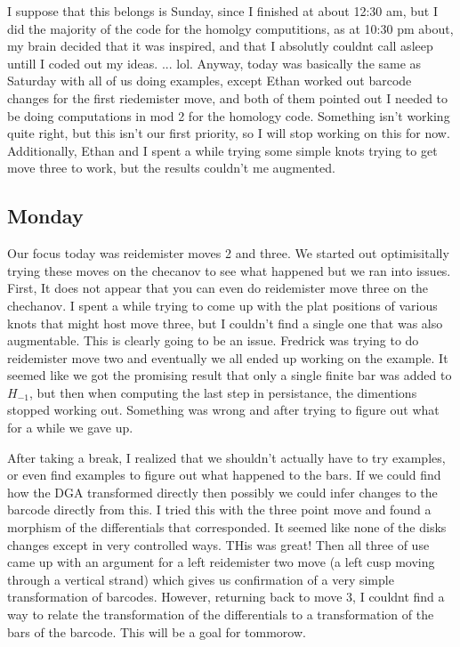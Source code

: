 \documentclass[11pt,oneside]{amsart}
\begin{document}
I suppose that this belongs is Sunday, since I finished at about 12:30 am, but I did the majority of the code for the homolgy computitions, as at 10:30 pm about, my brain decided that it was inspired, and that I absolutly couldnt call asleep untill I coded out my ideas.  ... lol.  Anyway, today was basically the same as Saturday with all of us doing examples, except Ethan worked out barcode changes for the first riedemister move, and both of them pointed out I needed to be doing computations in mod 2 for the homology code. Something isn't working quite right, but this isn't our first priority, so I will stop working on this for now. Additionally, Ethan and I spent a while trying some simple knots trying to get move three to work, but the results couldn't me augmented. 

\subsection{Monday}

Our focus today was reidemister moves 2 and three. We started out optimisitally trying these moves on the checanov to see what happened but we ran into issues. First, It does not appear that you can even do reidemister move three on the chechanov. I spent a while trying to come up with the plat positions of various knots that might host move three, but I couldn't find a single one that was also augmentable. This is clearly going to be an issue. Fredrick was trying to do reidemister move two and eventually we all ended up working on the example. It seemed like we got the promising result that only a single finite bar was added to $H_{-1}$, but then when computing the last step in persistance, the dimentions stopped working out. Something was wrong and after trying to figure out what for a while we gave up. 

After taking a break, I realized that we shouldn't actually have to try examples, or even find examples to figure out what happened to the bars. If we could find how the DGA transformed directly then possibly we could infer changes to the barcode directly from this. I tried this with the three point move and found a morphism of the differentials that corresponded. It seemed like none of the disks changes except in very controlled ways. THis was great! Then all three of use came up with an argument for a left reidemister two move (a left cusp moving through a vertical strand) which gives us confirmation of a very simple transformation of barcodes. However, returning back to move 3, I couldnt find a way to relate the transformation of the differentials to a transformation of the bars of the barcode. This will be a goal for tommorow. 
\end{document}
